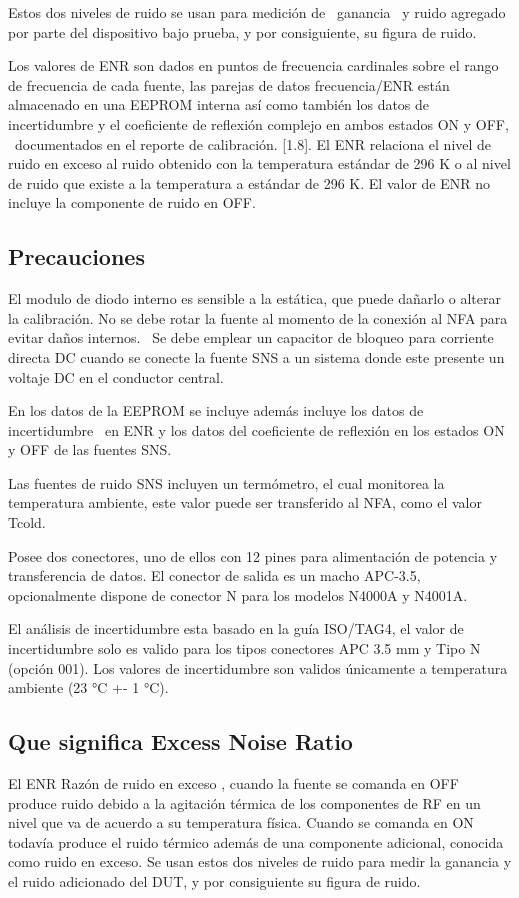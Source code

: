 \documentclass{article}
\begin{document}
Estos dos niveles de ruido se usan para medición de \ ganancia \ y ruido agregado por parte del dispositivo bajo prueba, y por consiguiente, su figura de ruido.

Los valores de ENR son dados en puntos de frecuencia cardinales sobre el rango de frecuencia de cada fuente, las parejas de datos frecuencia/ENR están almacenado en una EEPROM interna así como también los datos de incertidumbre y el coeficiente de reflexión complejo en ambos estados ON y OFF, \ documentados en el reporte de calibración. [1.8]. El ENR relaciona el nivel de ruido en exceso al ruido obtenido con la temperatura estándar de 296 K o al nivel de ruido que existe a la temperatura a estándar de 296 K. El valor de ENR no incluye la componente de ruido en OFF. 

\subsection[Precauciones]{Precauciones}
El modulo de diodo interno es sensible a la estática, que puede dañarlo o alterar la calibración. No se debe rotar la fuente al momento de la conexión al NFA para evitar daños internos. \ Se debe emplear un capacitor de bloqueo para corriente directa DC cuando se conecte la fuente SNS a un sistema donde este presente un voltaje DC en el conductor central.

En los datos de la EEPROM se incluye además incluye los datos de incertidumbre \ en ENR y los datos del coeficiente de reflexión en los estados ON y OFF de las fuentes SNS.

Las fuentes de ruido SNS incluyen un termómetro, el cual monitorea la temperatura ambiente, este valor puede ser transferido al NFA, como el valor Tcold.

Posee dos conectores, uno de ellos con 12 pines para alimentación de potencia y transferencia de datos. El conector de salida es un macho APC-3.5, opcionalmente dispone de conector N para los modelos N4000A y N4001A.

El análisis de incertidumbre esta basado en la guía ISO/TAG4, el valor de incertidumbre solo es valido para los tipos conectores APC 3.5 mm y Tipo N (opción 001). Los valores de incertidumbre son validos únicamente a temperatura ambiente (23 °C +- 1 °C).

\subsection{Que significa Excess Noise Ratio}
El ENR Razón de ruido en exceso , cuando la fuente se comanda en OFF produce ruido debido a la agitación térmica de los componentes de RF en un nivel que va de acuerdo a su temperatura física. Cuando se comanda en ON todavía produce el ruido térmico además de una componente adicional, conocida como ruido en exceso. Se usan estos dos niveles de ruido para medir la ganancia y el ruido adicionado del DUT, y por consiguiente su figura de ruido.
\end{document}
